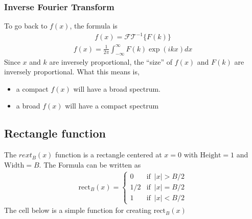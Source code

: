 \documentclass[letterpaper,10pt,english]{jupyterBook}
\begin{document}
\subsubsection{Inverse Fourier Transform}
\label{\detokenize{fFy:inverse-fourier-transform}}
\sphinxAtStartPar
To go back to \(f(x)\), the formula is
\begin{equation*}
\begin{split}
f(x) = \mathcal{FT}^{-1}\{F(k)\}
\end{split}
\end{equation*}\begin{equation*}
\begin{split}
f(x) = \frac{1}{2\pi} \int_{-\infty}^{\infty}F(k) \exp(ikx)dx
\end{split}
\end{equation*}
\sphinxAtStartPar
Since \(x\) and \(k\) are inversely proportional, the “size” of \(f(x)\) and \(F(k)\) are inversely proportional.
What this means is,
\begin{itemize}
\item {} 
\sphinxAtStartPar
a compact \(f(x)\) will have a broad spectrum.

\item {} 
\sphinxAtStartPar
a broad \(f(x)\) will have a compact spectrum

\end{itemize}


\subsection{Rectangle function}
\label{\detokenize{fFy:rectangle-function}}
\sphinxAtStartPar
The \(rext_B(x)\) function is a rectangle centered at \(x=0\) with \(\text{Height}=1\) and \(\text{Width}=B\). The Formula can be written as
\begin{equation*}
\begin{split}
\text{rect}_B(x) =
\begin{cases}
0 & \text{if} \,\,\, |x| > B/2\\[2pt]
1/2 & \text{if} \,\,\, |x| = B/2 \\[2pt]
1 & \text{if} \,\,\, |x| < B/2
\end{cases}
\end{split}
\end{equation*}
\sphinxAtStartPar
The cell below is a simple function for creating \(\text{rect}_B(x)\)
\end{document}

